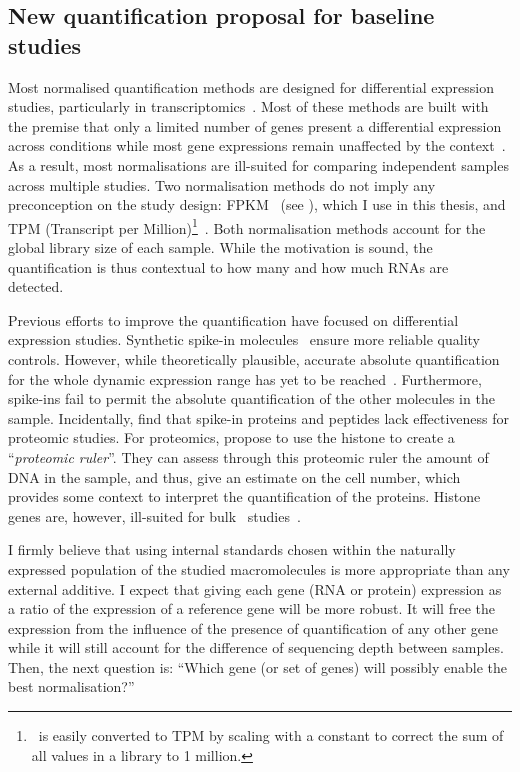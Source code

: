 \subsection*{New quantification proposal for baseline studies}
\vspace{-6mm}
Most normalised quantification methods are designed
for differential expression studies,
particularly in transcriptomics~.
Most of these methods are built with the premise
that only a limited number of genes present a differential expression across conditions
while most gene expressions remain unaffected by the context~.
As a result, most normalisations are ill-suited
for comparing independent samples across multiple studies.
Two normalisation methods do not imply any preconception on the study design:
\gls{FPKM}~ (see ),
which I use in this thesis,
and TPM (Transcript per Million)\footnote{%
\FPKM\ is easily converted to TPM by scaling with a constant
to correct the sum of all values in a library to 1 million.
}~.
Both normalisation methods account for the global library size of each sample.
While the motivation is sound,
the quantification is thus contextual
to %
how many
and how much \glspl{RNA} are detected.\mybr\

Previous efforts to improve the quantification have focused
on differential expression studies.
Synthetic spike-in molecules~
ensure more reliable quality controls.
However, while theoretically plausible,
accurate absolute quantification for the whole dynamic expression range
has yet to be reached~.
Furthermore, spike-ins fail to permit the absolute quantification
of the other molecules in the sample.
Incidentally, \citet{Rudnick2014-ar} find that spike-in proteins and peptides
lack effectiveness for proteomic studies.
For proteomics, \citet{Wisniewski2014-kh} propose
to use the histone to create a \enquote{\emph{proteomic ruler}}.
They can assess through this proteomic ruler the amount of \gls{DNA}
in the sample, and thus, give an estimate on the cell number,
which provides some context to interpret the quantification of the proteins.
Histone genes are, however, ill-suited
for bulk \Rnaseq\ studies~.\mybr\

I firmly believe that using internal standards chosen
within the naturally expressed population of the studied macromolecules
is more appropriate than any external additive.
I expect that giving each gene (RNA or protein) expression
as a ratio of the expression of a reference gene will be more robust.
It will free the expression
from the influence of the presence of quantification of any other gene
while it will still account for the difference of sequencing depth between samples.
Then, the next question is:
\enquote{Which gene (or set of genes) will possibly enable the best normalisation?}\mybr\

